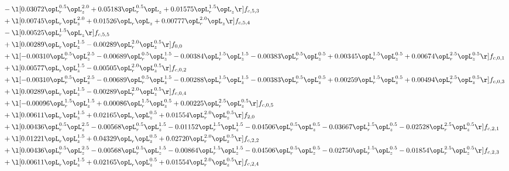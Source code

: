 \begin{alignat}{2}
& - \l[  0.03072 \opL_r^{0.5} \opL_z^{2.0} +  0.05183 \opL_r^{0.5} \opL_z +  0.01575 \opL_r^{1.5} \opL_z  \r] f_{c,5,3} \nonumber \\ 
& + \l[  0.00745 \opL_r \opL_z^{2.0} +  0.01526 \opL_r \opL_z +  0.00777 \opL_r^{2.0} \opL_z  \r] f_{c,5,4} \nonumber \\ 
& - \l[  0.00525 \opL_r^{1.5} \opL_z  \r] f_{c,5,5} \nonumber \\ 
& + \l[  0.00289 \opL_r \opL_z^{1.5}   -0.00289 \opL_r^{2.0} \opL_z^{0.5}  \r] f_{0,0} \nonumber \\ 
& + \l[  -0.00310 \opL_r^{0.5} \opL_z^{2.5}   -0.00689 \opL_r^{0.5} \opL_z^{1.5}   -0.00384 \opL_r^{1.5} \opL_z^{1.5}   -0.00383 \opL_r^{0.5} \opL_z^{0.5} +  0.00345 \opL_r^{1.5} \opL_z^{0.5} +  0.00674 \opL_r^{2.5} \opL_z^{0.5}  \r] f_{c,0,1} \nonumber \\ 
& + \l[  0.00577 \opL_r \opL_z^{1.5}   -0.00505 \opL_r^{2.0} \opL_z^{0.5}  \r] f_{c,0,2} \nonumber \\ 
& + \l[  -0.00310 \opL_r^{0.5} \opL_z^{2.5}   -0.00689 \opL_r^{0.5} \opL_z^{1.5}   -0.00288 \opL_r^{1.5} \opL_z^{1.5}   -0.00383 \opL_r^{0.5} \opL_z^{0.5} +  0.00259 \opL_r^{1.5} \opL_z^{0.5} +  0.00494 \opL_r^{2.5} \opL_z^{0.5}  \r] f_{c,0,3} \nonumber \\ 
& + \l[  0.00289 \opL_r \opL_z^{1.5}   -0.00289 \opL_r^{2.0} \opL_z^{0.5}  \r] f_{c,0,4} \nonumber \\ 
& + \l[  -0.00096 \opL_r^{1.5} \opL_z^{1.5} +  0.00086 \opL_r^{1.5} \opL_z^{0.5} +  0.00225 \opL_r^{2.5} \opL_z^{0.5}  \r] f_{c,0,5} \nonumber \\ 
& + \l[  0.00611 \opL_r \opL_z^{1.5} +  0.02165 \opL_r \opL_z^{0.5} +  0.01554 \opL_r^{2.0} \opL_z^{0.5}  \r] f_{2,0} \nonumber \\ 
& + \l[  0.00436 \opL_r^{0.5} \opL_z^{2.5}   -0.00568 \opL_r^{0.5} \opL_z^{1.5}   -0.01152 \opL_r^{1.5} \opL_z^{1.5}   -0.04506 \opL_r^{0.5} \opL_z^{0.5}   -0.03667 \opL_r^{1.5} \opL_z^{0.5}   -0.02528 \opL_r^{2.5} \opL_z^{0.5}  \r] f_{c,2,1} \nonumber \\ 
& + \l[  0.01221 \opL_r \opL_z^{1.5} +  0.04329 \opL_r \opL_z^{0.5} +  0.02720 \opL_r^{2.0} \opL_z^{0.5}  \r] f_{c,2,2} \nonumber \\ 
& + \l[  0.00436 \opL_r^{0.5} \opL_z^{2.5}   -0.00568 \opL_r^{0.5} \opL_z^{1.5}   -0.00864 \opL_r^{1.5} \opL_z^{1.5}   -0.04506 \opL_r^{0.5} \opL_z^{0.5}   -0.02750 \opL_r^{1.5} \opL_z^{0.5}   -0.01854 \opL_r^{2.5} \opL_z^{0.5}  \r] f_{c,2,3} \nonumber \\ 
& + \l[  0.00611 \opL_r \opL_z^{1.5} +  0.02165 \opL_r \opL_z^{0.5} +  0.01554 \opL_r^{2.0} \opL_z^{0.5}  \r] f_{c,2,4} \nonumber \\ 

\end{alignat}
